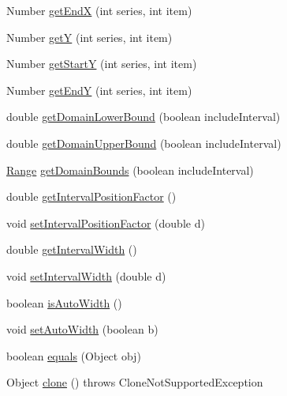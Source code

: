 \begin{DoxyCompactItemize}
\item 
Number \mbox{\hyperlink{classorg_1_1jfree_1_1data_1_1xy_1_1_category_table_x_y_dataset_aefff418737db29aec9769d4d2061c0d1}{get\+EndX}} (int series, int item)
\item 
Number \mbox{\hyperlink{classorg_1_1jfree_1_1data_1_1xy_1_1_category_table_x_y_dataset_afd52434e62b1890759230d8f4aa6059f}{getY}} (int series, int item)
\item 
Number \mbox{\hyperlink{classorg_1_1jfree_1_1data_1_1xy_1_1_category_table_x_y_dataset_a238f0976910c53c4ad62cf58ec3e758c}{get\+StartY}} (int series, int item)
\item 
Number \mbox{\hyperlink{classorg_1_1jfree_1_1data_1_1xy_1_1_category_table_x_y_dataset_a3b33bd6fe3e1cdd39ded107e410bb594}{get\+EndY}} (int series, int item)
\item 
double \mbox{\hyperlink{classorg_1_1jfree_1_1data_1_1xy_1_1_category_table_x_y_dataset_aef047ab681bbb08115dc9769f5bcb52a}{get\+Domain\+Lower\+Bound}} (boolean include\+Interval)
\item 
double \mbox{\hyperlink{classorg_1_1jfree_1_1data_1_1xy_1_1_category_table_x_y_dataset_a9b3fb26c625c5e1d04b30277f993edc1}{get\+Domain\+Upper\+Bound}} (boolean include\+Interval)
\item 
\mbox{\hyperlink{classorg_1_1jfree_1_1data_1_1_range}{Range}} \mbox{\hyperlink{classorg_1_1jfree_1_1data_1_1xy_1_1_category_table_x_y_dataset_a11cf2d528ab14a6d2affc68ff258d9e4}{get\+Domain\+Bounds}} (boolean include\+Interval)
\item 
double \mbox{\hyperlink{classorg_1_1jfree_1_1data_1_1xy_1_1_category_table_x_y_dataset_aba532666bb1576bf9403a07c0600fbd0}{get\+Interval\+Position\+Factor}} ()
\item 
void \mbox{\hyperlink{classorg_1_1jfree_1_1data_1_1xy_1_1_category_table_x_y_dataset_a43c5528fba04fca041e649924172a59c}{set\+Interval\+Position\+Factor}} (double d)
\item 
double \mbox{\hyperlink{classorg_1_1jfree_1_1data_1_1xy_1_1_category_table_x_y_dataset_ae0fde6f13a6ad35b98f90666d506cb21}{get\+Interval\+Width}} ()
\item 
void \mbox{\hyperlink{classorg_1_1jfree_1_1data_1_1xy_1_1_category_table_x_y_dataset_ae6bbb4892fbf3be9e8b0b5ec537de284}{set\+Interval\+Width}} (double d)
\item 
boolean \mbox{\hyperlink{classorg_1_1jfree_1_1data_1_1xy_1_1_category_table_x_y_dataset_ac747ccee0dea4904bee097b9c4926774}{is\+Auto\+Width}} ()
\item 
void \mbox{\hyperlink{classorg_1_1jfree_1_1data_1_1xy_1_1_category_table_x_y_dataset_a609822212a94fa186243b43740c7cd9c}{set\+Auto\+Width}} (boolean b)
\item 
boolean \mbox{\hyperlink{classorg_1_1jfree_1_1data_1_1xy_1_1_category_table_x_y_dataset_a4a21e0f7ee6a3f85461366c1c988ef19}{equals}} (Object obj)
\item 
Object \mbox{\hyperlink{classorg_1_1jfree_1_1data_1_1xy_1_1_category_table_x_y_dataset_a3aa241debcd2379b7dacfc4a9a781b46}{clone}} ()  throws Clone\+Not\+Supported\+Exception 
\end{DoxyCompactItemize}

